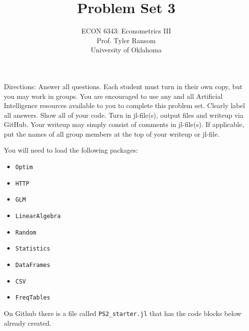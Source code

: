\documentclass[12pt,english]{article}
\begin{document}
\title{Problem Set 3}
\author{ECON 6343: Econometrics III\\
Prof. Tyler Ransom\\
University of Oklahoma}
\date{}%

\maketitle
Directions: Answer all questions. Each student must turn in their own copy, but you may work in groups. You are encouraged to use any and all Artificial Intelligence resources available to you to complete this problem set. Clearly label all answers. Show all of your code. Turn in jl-file(s), output files and writeup via GitHub. Your writeup may simply consist of comments in jl-file(s). If applicable, put the names of all group members at the top of your writeup or jl-file.

You will need to load the following packages:
\begin{itemize}
    \item[~] \texttt{Optim} 
    \item[~] \texttt{HTTP} 
    \item[~] \texttt{GLM} 
    \item[~] \texttt{LinearAlgebra} 
    \item[~] \texttt{Random} 
    \item[~] \texttt{Statistics} 
    \item[~] \texttt{DataFrames} 
    \item[~] \texttt{CSV} 
    \item[~] \texttt{FreqTables}
\end{itemize}

On Github there is a file called \texttt{PS2\_starter.jl} that has the code blocks below already created.
\end{document}
